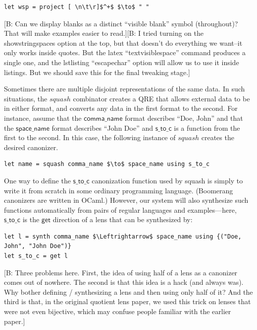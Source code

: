 \documentclass[acmsmall,review,anonymous]{acmart}
\newcommand{\FINISH}[3]{\ifdraft\textcolor{#1}{[#2: #3]}\fi}
\newcommand{\bcp}[1]{\FINISH{dkred}{B}{#1}}
\newcommand{\kw}[1]{\ensuremath{\mathit{#1}}}
\newcommand{\codefont}[1]{\ensuremath{\mathsf{#1}}}
\newcommand{\bibtex}{\textsc{Bib}\TeX{}}
\begin{document}
\begin{lstlisting}
let wsp = project [ \n\t\r]$^+$ $\to$ " "
\end{lstlisting}
\iflastminute
\bcp{Can we display blanks as a distinct ``visible blank'' symbol
(throughout)?  That will make examples easier to read.}\bcp{I tried turning
on the showstringspaces option at the top, but that doesn't do everything we
want--it only works inside quotes.  But the latex ``textvisiblespace'' command
produces a single one, and the lstlisting ``escapechar'' option will allow
us to use it inside listings.  But we should save this for the final
tweaking stage.}
\fi

Sometimes there are multiple disjoint representations of the same data.
In such situations, the \kw{squash} combinator creates a QRE that
allows external data to be in either format, and converts any
data in the first format to the second.
For instance, assume that
the \codefont{comma\_name} format describes ``Doe, John''
and that the \codefont{space\_name} format describes ``John Doe''
and \codefont{s\_to\_c} is a function from the first to the second.  In this case,
the following instance of \kw{squash} creates the desired canonizer.


\begin{lstlisting}
let name = squash comma_name $\to$ space_name using s_to_c
\end{lstlisting}

One way to define the \codefont{s\_to\_c} canonization function used by squash
is simply to write it from scratch in some ordinary programming language. (Boomerang canonizers are written in OCaml.)
However, our system will also synthesize such functions automatically from pairs
of regular languages and examples---here, \codefont{s\_to\_c} is the
\codefont{get} direction of a lens that can be synthesized by:
%
\begin{lstlisting}
let l = synth comma_name $\Leftrightarrow$ space_name using {("Doe, John", "John Doe")}
let s_to_c = get l
\end{lstlisting}
%
\bcp{Three problems here. First, the idea of using half of a lens
as a canonizer comes out of nowhere.  The second is that this idea is a hack
(and always was).  Why bother defining / synthesizing a lens and then using only
half of it?  And the third is that, in the original quotient lens paper,
we used this trick on lenses that were not even bijective, which may confuse
people familiar with the earlier paper.}
\end{document}
